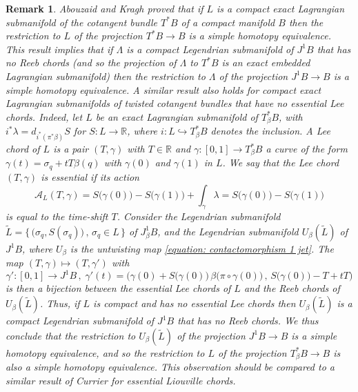 \documentclass{amsart}
\newtheorem{remark}[thm]{Remark}
\theoremstyle{remark}
\begin{document}
\begin{remark}\label{remark: AK}
Abouzaid and Kragh \cite{AK}
proved that
if $L$ is a compact exact Lagrangian submanifold
of the cotangent bundle $T^{\ast}B$
of a compact manifold $B$
then the restriction to $L$
of the projection $T^{\ast}B \rightarrow B$
is a simple homotopy equivalence.
This result implies that
if $\Lambda$ is a compact Legendrian submanifold of $J^1B$
that has no Reeb chords
(and so the projection of $\Lambda$ to $T^{\ast}B$
is an exact embedded Lagrangian submanifold)
then the restriction to $\Lambda$
of the projection $J^1B \rightarrow B$
is a simple homotopy equivalence.
A similar result also holds for compact exact Lagrangian submanifolds
of twisted cotangent bundles
that have no essential Lee chords.
Indeed,
let $L$ be an exact Lagrangian submanifold of $T_{\beta}^{\ast}B$,
with $i^{\ast}\lambda = d_{i^{\ast}(\pi^{\ast}\beta)} S$
for $S: L \rightarrow \mathbb{R}$,
where $i: L \hookrightarrow T^{\ast}_{\beta}B$ denotes the inclusion.
A Lee chord of $L$ is a pair $(T, \gamma)$
with $T \in \mathbb{R}$
and $\gamma: [0,1] \rightarrow T^{\ast}_{\beta}B$
a curve of the form $\gamma (t) = \sigma_q + tT \beta(q)$
with $\gamma(0)$ and $\gamma(1)$ in $L$.
We say that the Lee chord $(T, \gamma)$ is essential
if its action
\[
\mathcal{A}_L (T, \gamma)
= S \big(\gamma(0)\big) - S \big(\gamma(1)\big) + \int_{\gamma}\lambda
= S \big(\gamma(0)\big) - S \big(\gamma(1)\big)
\]
is equal to the time-shift $T$.
Consider the Legendrian submanifold
$\widetilde{L} = \{\, \big( \sigma_q , S(\sigma_q) \big) \,,\, \sigma_q \in L \,\}$
of $J^1_{\beta}B$,
and the Legendrian submanifold $U_{\beta} (\widetilde{L})$ of $J^1B$,
where $U_{\beta}$ is the untwisting map \eqref{equation: contactomorphism 1 jet}.
The map $(T, \gamma) \mapsto (T, \gamma')$
with
\[
\gamma': [0, 1] \rightarrow J^1B \,,\;
\gamma'(t) = \Big( \gamma(0) + S \big(\gamma(0)\big) \, \beta \big( \pi \circ \gamma (0) \big) \,,\,
S \big(\gamma(0)\big) - T + tT \Big)
\]
is then a bijection
between the essential Lee chords of $L$
and the Reeb chords of $U_{\beta} (\widetilde{L})$.
Thus,
if $L$ is compact and has no essential Lee chords
then $U_{\beta} (\widetilde{L})$ is a compact Legendrian submanifold of $J^1B$
that has no Reeb chords.
We thus conclude that the restriction to $U_{\beta} (\widetilde{L})$
of the projection $J^1B \rightarrow B$
is a simple homotopy equivalence,
and so the restriction to $L$
of the projection $T^{\ast}_{\beta}B \rightarrow B$
is also a simple homotopy equivalence.
This observation should be compared
to a similar result of Currier \cite[Theorem 1.3]{Currier}
for essential Liouville chords.
\end{remark}
\end{document}
